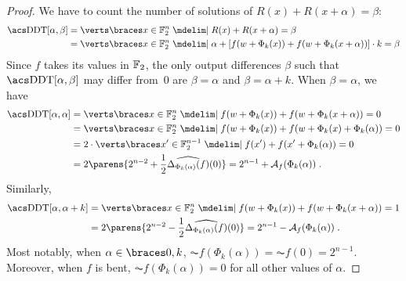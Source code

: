\begin{proof}
    We have to count the number of solutions of $R(x) + R(x + \alpha) = \beta$:
    \begin{align*}
        \mathrm{\DDTs/}[\alpha,\beta] & = \abs{\set{x \in \F_2^n \given R(x) + R(x + \alpha) = \beta}}\\
                                      & = \abs{\set{x \in \F_2^n \given \alpha + \left[f( w + \Phi_k(x)) + f( w + \Phi_k(x + \alpha))\right] \cdot k = \beta}}
    \end{align*}
    Since $f$ takes its values in $\mathbb{F}_2$, the only output differences $\beta$ such that $\text{\DDTs/}[\alpha,\beta]$ may differ from~$0$ are $\beta=\alpha$ and $\beta=\alpha +k$.
    When $\beta=\alpha$, we have
    \begin{align*}
        \mathrm{\DDTs/}[\alpha,\alpha] & = \abs{\set{x \in \F_2^n \given f( w + \Phi_k(x)) + f( w + \Phi_k(x + \alpha)) = 0}} \\
                                       & = \abs{\set{x \in \F_2^n \given f( w + \Phi_k(x)) + f( w + \Phi_k(x) + \Phi_k(\alpha)) = 0}} \\
                                       & = 2 \cdot \abs{\set{x^\prime \in \F_2^{n-1} \given f(x^\prime) + f(x^\prime + \Phi_k(\alpha)) = 0}} \\
                                       & = 2 \parens{2^{n-2} + \frac{1}{2} \widehat{\Delta_{\Phi_k(\alpha)}(f)}(0)} = 2^{n-1} + \AC{f}(\Phi_k(\alpha))\;.
    \end{align*}
    Similarly,
    \begin{align*}
        \mathrm{\DDTs/}[\alpha,\alpha+k] & = \abs{\set{x \in \F_2^n \given f( w + \Phi_k(x)) + f( w + \Phi_k(x + \alpha)) = 1}} \\
                                         & = 2 \parens{2^{n-2} - \frac{1}{2} \widehat{\Delta_{\Phi_k(\alpha)}(f)}(0)} = 2^{n-1} - \AC{f}(\Phi_k(\alpha))\;.
    \end{align*}
    Most notably, when $\alpha \in \set{0,k}$, $\AC{f}(\Phi_k(\alpha)) = \AC{f}(0) = 2^{n-1}$.
    Moreover, when $f$ is bent, $\AC{f}(\Phi_k(\alpha)) = 0$ for all other values of $\alpha$.
\end{proof}

